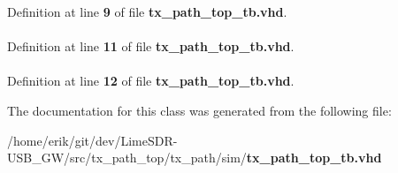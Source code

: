 Definition at line {\bf 9} of file {\bf tx\+\_\+path\+\_\+top\+\_\+tb.\+vhd}.

\paragraph[{S\+T\+D\+\_\+\+L\+O\+G\+I\+C\+\_\+\+T\+E\+X\+T\+IO}]{\hspace{0.3cm}{\ttfamily [Package]}}\label{classtx__path__top__tb_a9a20322ff9f4f65f8efd825c83bfd99d}


Definition at line {\bf 11} of file {\bf tx\+\_\+path\+\_\+top\+\_\+tb.\+vhd}.

\paragraph[{textio}]{\hspace{0.3cm}{\ttfamily [Package]}}\label{classtx__path__top__tb_aa8c4e25998323a84db5b1fa701b92fcb}


Definition at line {\bf 12} of file {\bf tx\+\_\+path\+\_\+top\+\_\+tb.\+vhd}.



The documentation for this class was generated from the following file\+:\begin{DoxyCompactItemize}
\item 
/home/erik/git/dev/\+Lime\+S\+D\+R-\/\+U\+S\+B\+\_\+\+G\+W/src/tx\+\_\+path\+\_\+top/tx\+\_\+path/sim/{\bf tx\+\_\+path\+\_\+top\+\_\+tb.\+vhd}\end{DoxyCompactItemize}
